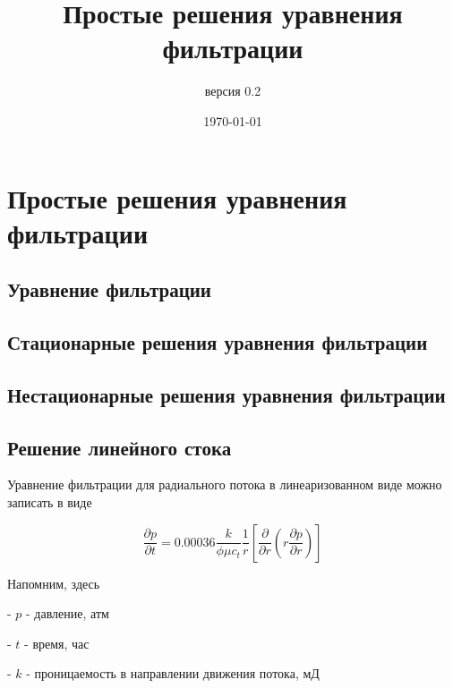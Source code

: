 \documentclass[oneside, openany]{memoir}
\author{версия 0.2}
\title{Простые решения уравнения фильтрации}
\date{\today}
\begin{document}
	
	\maketitle
	
	\chapter{Простые решения уравнения фильтрации}
	
	\section{Уравнение фильтрации}
	
	
	
	
	\section{Стационарные решения уравнения фильтрации}
	
	
	
	
	
	\section{Нестационарные решения уравнения фильтрации}
	
	
	

	
	\section{Решение линейного стока}
	
	Уравнение фильтрации для радиального потока в линеаризованном виде можно записать в виде
	
	\begin{equation}
		\frac{\partial p}{\partial t} = 0.00036 \dfrac{k}{\phi \mu c_t} \dfrac{1}{r} \left[ \dfrac{\partial}{\partial r} \left( r \dfrac{ \partial p} {\partial r} \right) \right]		
	\end{equation} 

	
	Напомним, здесь
	
	- $p$ - давление, атм
	
	- $t$ - время, час
	
	- $k$ - проницаемость в направлении движения потока, мД
	
\end{document}
